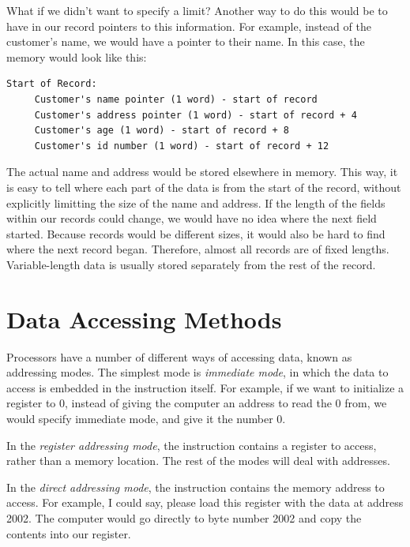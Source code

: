 What if we didn't want to specify a limit?
Another way to do this would be to have in our record pointers to this
information.  For example, instead of the customer's name, we would have
a pointer to their name.  In this case, the memory would look like this:

\begin{simpletyping}
\begin{lstlisting}
Start of Record:
     Customer's name pointer (1 word) - start of record
     Customer's address pointer (1 word) - start of record + 4
     Customer's age (1 word) - start of record + 8
     Customer's id number (1 word) - start of record + 12
\end{lstlisting}
\end{simpletyping}

The actual name and address would be stored elsewhere in memory.  This
way, it is easy to tell where each part of the data is from the start
of the record, without explicitly limitting the size of the name and
address.  If the length of the fields within our records could change,
we would have no idea where the next field started.  Because records
would be different sizes, it would also be hard to find where the
next record began.  Therefore, almost all records are of fixed lengths.
Variable-length data is usually stored separately from the rest of the
record.

\section{Data Accessing Methods}
\label{dataaccessingmethods}


Processors have a number of different ways of accessing data, known
as addressing modes.  The simplest mode is 
\emph{immediate mode}, in which the data to access is
embedded in the instruction itself.  For example, if we want to initialize
a register to 0, instead of giving the computer an address to read the
0 from, we would specify immediate mode, and give it the number 0.

In the \emph{register addressing mode},
the instruction contains a register to access, rather than a memory location.
The rest of the modes will deal with addresses.

In the \emph{direct addressing mode}, the instruction contains
the memory address to access.  For example, I could say, please load
this register with the data at address 2002.  The computer would go
directly to byte number 2002 and copy the contents into our register.

